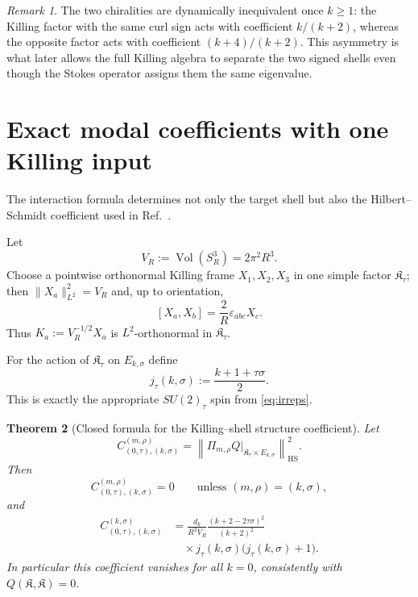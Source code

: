 \documentclass[
 aps,
 prd,
 reprint,
 amsmath,
 amssymb,
 nofootinbib,
 superscriptaddress
]{revtex4-2}
\newtheorem{theorem}{Theorem}[section]
\theoremstyle{definition}
\theoremstyle{remark}
\newtheorem{remark}[theorem]{Remark}
\newcommand{\Vol}{\operatorname{Vol}}
\newcommand{\cK}{\mathfrak K}
\begin{document}
\begin{remark}
The two chiralities are dynamically inequivalent once $k\ge1$: the Killing
factor with the same curl sign acts with coefficient $k/(k+2)$, whereas the
opposite factor acts with coefficient $(k+4)/(k+2)$.  This asymmetry is what
later allows the full Killing algebra to separate the two signed shells even
though the Stokes operator assigns them the same eigenvalue.
\end{remark}



\section{Exact modal coefficients with one Killing input}

The interaction formula determines not only the target shell but also the
Hilbert--Schmidt coefficient used in Ref.~\cite{PreeceBatenin2026}.

Let
\[
 V_R:=\Vol(S^3_R)=2\pi^2R^3.
\]
Choose a pointwise orthonormal Killing frame
$X_1,X_2,X_3$ in one simple factor $\cK_\tau$; then
$\|X_a\|_{L^2}^2=V_R$ and, up to orientation,
\[
 [X_a,X_b]=\frac{2}{R}\varepsilon_{abc}X_c.
\]
Thus $K_a:=V_R^{-1/2}X_a$ is $L^2$-orthonormal in $\cK_\tau$.

For the action of $\cK_\tau$ on $E_{k,\sigma}$ define
\begin{equation}
 j_\tau(k,\sigma)
 :=
 \frac{k+1+\tau\sigma}{2}.
 \label{eq:jtausigma}
\end{equation}
This is exactly the appropriate $SU(2)_\tau$ spin from \eqref{eq:irreps}.

\begin{theorem}[Closed formula for the Killing--shell structure coefficient]
\label{thm:modalC}
Let
\[
 C_{(0,\tau),(k,\sigma)}^{(m,\rho)}
 =
 \left\|
 \Pi_{m,\rho}Q
 \big|_{\cK_\tau\times E_{k,\sigma}}
 \right\|_{\mathrm{HS}}^2.
\]
Then
\begin{equation}
 C_{(0,\tau),(k,\sigma)}^{(m,\rho)}=0
 \qquad
 \text{unless }(m,\rho)=(k,\sigma),
 \label{eq:Czero}
\end{equation}
and
\begin{equation}
\boxed{
\begin{aligned}
 C_{(0,\tau),(k,\sigma)}^{(k,\sigma)}
 &=
 \frac{d_k}{R^2V_R}
 \frac{(k+2-2\tau\sigma)^2}{(k+2)^2}\\
 &\quad\times
 j_\tau(k,\sigma)\bigl(j_\tau(k,\sigma)+1\bigr).
\end{aligned}}
\label{eq:Cexact}
\end{equation}
In particular this coefficient vanishes for all $k=0$, consistently with
$Q(\cK,\cK)=0$.
\end{theorem}
\end{document}
